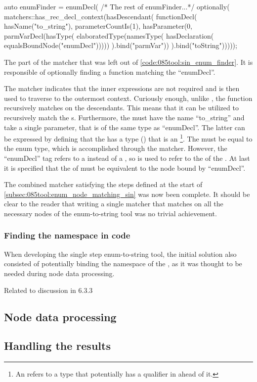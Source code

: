 \begin{listing}[H]
    \begin{cppcode}
auto enumFinder = enumDecl(
  /* The rest of enumFinder...*/
  optionally(
    matchers::has_rec_decl_context(hasDescendant(
      functionDecl(
        hasName("to_string"),
        parameterCountIs(1),
        hasParameter(0,
          parmVarDecl(hasType(
            elaboratedType(namesType(
              hasDeclaration(
                equalsBoundNode("enumDecl")))))
          ).bind("parmVar"))
      ).bind("toString")))));
    \end{cppcode}
    \caption{The part of the  matcher that was left out of \cref{code:085tool:sin_enum_finder}. It is responsible of optionally finding a  function matching the ``enumDecl''.}
    \label{code:085tool:has_enum_to_string}
\end{listing}


The  matcher indicates that the inner expressions are not required and  is then used to traverse to the outermost context.
Curiously enough, unlike , the  function recursively matches on the descendants. This means that it can be utilized to recursively match the s.
Furthermore, the  must have the name ``to\_string'' and take a single parameter, that is of the same type as ``enumDecl''.
The latter can be expressed by defining that the  has a type () that is an \footnote{
    An  refers to a type that potentially has a qualifier in ahead of it.
}.
The  must be equal to the enum type, which is accomplished through the  matcher.
However, the ``enumDecl'' tag refers to a  instead of a , so  is used to refer to the  of the . At last it is specified that the  of must be equivalent to the node bound by ``enumDecl''.

The combined matcher satisfying the steps defined at the start of \cref{subsec:085tool:enum_node_matching_sin} was now been complete.
It should be clear to the reader that writing a single matcher that matches on all the necessary nodes of the enum-to-string tool was no trivial achievement.

\subsubsection*{Finding the namespace in code}
When developing the single step enum-to-string tool, the initial solution also consisted of potentially binding the namespace of the , as it was thought to be needed during node data processing.

Related to discussion in 6.3.3

\subsection{Node data processing}

\subsection{Handling the results}